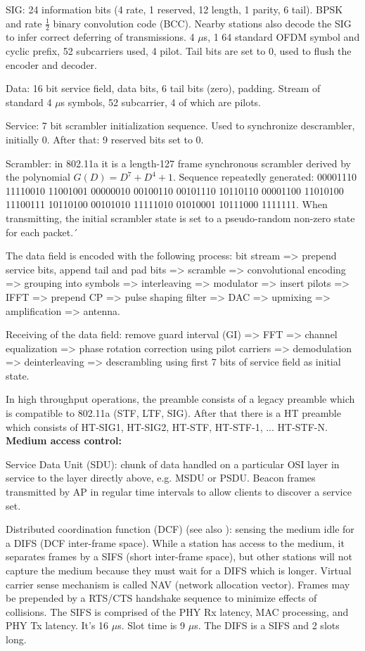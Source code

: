 SIG: 24 information bits (4 rate, 1 reserved, 12 length, 1 parity, 6 tail). BPSK and rate $\frac{1}{2}$ binary convolution code (BCC). Nearby stations also decode the SIG to infer correct deferring of transmissions. 4 $\mu$s, 1 64 standard OFDM symbol and cyclic prefix, 52 subcarriers used, 4 pilot. Tail bits are set to 0, used to flush the encoder and decoder.

Data: 16 bit service field, data bits, 6 tail bits (zero), padding. Stream of standard 4 $\mu$s symbols, 52 subcarrier, 4 of which are pilots.

Service: 7 bit scrambler initialization sequence. Used to synchronize descrambler, initially 0. After that: 9 reserved bits set to 0.

Scrambler: in 802.11a it is a length-127 frame synchronous scrambler derived by the polynomial $G(D)=D^7+D^4+1$. Sequence repeatedly generated: 00001110 11110010 11001001 00000010 00100110 00101110 10110110 00001100 11010100 11100111 10110100 00101010 11111010 01010001 10111000 1111111. When transmitting, the initial scrambler state is set to a pseudo-random non-zero state for each packet.´

The data field is encoded with the following process: bit stream => prepend service bits, append tail and pad bits => scramble => convolutional encoding => grouping into symbols => interleaving => modulator => insert pilots => IFFT => prepend CP => pulse shaping filter => DAC => upmixing => amplification => antenna.

Receiving of the data field: remove guard interval (GI) => FFT => channel equalization => phase rotation correction using pilot carriers => demodulation => deinterleaving => descrambling using first 7 bits of service field as initial state.

In high throughput operations, the preamble consists of a legacy preamble which is compatible to 802.11a (STF, LTF, SIG). After that there is a HT preamble which consists of HT-SIG1, HT-SIG2, HT-STF, HT-STF-1, ... HT-STF-N.\\

\textbf{Medium access control:}

Service Data Unit (SDU): chunk of data handled on a particular OSI layer in service to the layer directly above, e.g. MSDU or PSDU. Beacon frames transmitted by AP in regular time intervals to allow clients to discover a service set.

Distributed coordination function (DCF) (see also \cite{bianchi2000}): sensing the medium idle for a DIFS (DCF inter-frame space). While a station has access to the medium, it separates frames by a SIFS (short inter-frame space), but other stations will not capture the medium because they must wait for a DIFS which is longer. Virtual carrier sense mechanism is called NAV (network allocation vector). Frames may be prepended by a RTS/CTS handshake sequence to minimize effects of collisions. The SIFS is comprised of the PHY Rx latency, MAC processing, and PHY Tx latency. It's 16 $\mu$s. Slot time is 9 $\mu$s. The DIFS is a SIFS and 2 slots long.

